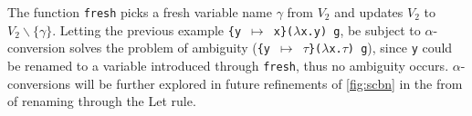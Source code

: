 The function \texttt{fresh} picks a fresh variable name $\gamma$ from $V_2$ and updates $V_2$ to $V_2 \backslash \{\gamma\}$.
Letting the previous example \texttt{\{y $\mapsto$ x\}($\lambda$x.y) g}, be subject to $\alpha$-conversion solves the problem of ambiguity (\texttt{\{y $\mapsto$ $\tau$\}($\lambda$x.$\tau$) g}), since \texttt{y} could be renamed to a variable introduced through \texttt{fresh}, thus no ambiguity occurs.
$\alpha$-conversions will be further explored in future refinements of \autoref{fig:scbn} in the from of renaming through the Let rule.

